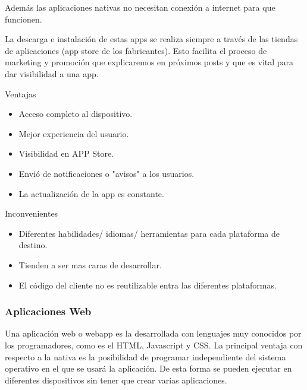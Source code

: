 Además las aplicaciones nativas no necesitan conexión a internet para que funcionen.

La descarga e instalación de estas apps se realiza siempre a través de las tiendas de aplicaciones (app store de los fabricantes). Esto facilita el proceso de marketing y promoción que explicaremos en próximos posts y que es vital para dar visibilidad a una app.

Ventajas
\setlength{\parskip}{0mm}
\begin{itemize}

	\item Acceso completo al dispositivo. 
	
	\item Mejor experiencia del usuario. 
	
	\item Visibilidad en APP Store.
	
	\item Envió de notificaciones o "avisos" a los usuarios.
	
	\item La actualización de la app es constante.
	
\end{itemize}

Inconvenientes

\begin{itemize}

	\item Diferentes habilidades/ idiomas/ herramientas para cada plataforma de destino.

	\item Tienden a ser mas caras de desarrollar. 

	\item El código del cliente no es reutilizable entra las diferentes plataformas.
	
\end{itemize}

\subsubsection{Aplicaciones Web}
\setlength{\parskip}{5mm}
Una aplicación web o webapp es la desarrollada con lenguajes muy conocidos por los programadores, como es el HTML, Javascript y CSS. La principal ventaja con respecto a la nativa es la posibilidad de programar independiente del sistema operativo en el que se usará la aplicación. De esta forma se pueden ejecutar en diferentes dispositivos sin tener que crear varias aplicaciones.

